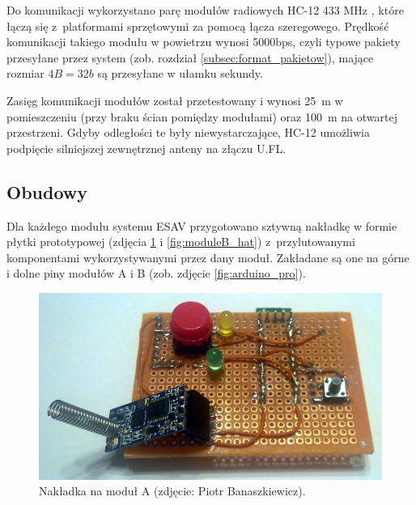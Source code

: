 Do komunikacji wykorzystano parę modułów radiowych HC-12 433 MHz \cite{HC12}, które łączą się z~platformami sprzętowymi za pomocą łącza szeregowego. Prędkość komunikacji takiego modułu w powietrzu wynosi 5000bps, czyli typowe pakiety przesyłane przez system (zob. rozdział \ref{subsec:format_pakietow}), mające rozmiar $ 4B=32b $ są przesyłane w ułamku sekundy.

Zasięg komunikacji modułów został przetestowany i wynosi \SI{25}{\meter} w pomieszczeniu (przy braku ścian pomiędzy modułami) oraz \SI{100}{\meter} na otwartej przestrzeni. Gdyby odległości te były niewystarczające, HC-12 umożliwia podpięcie silniejszej zewnętrznej anteny \cite{HC12} na złączu U.FL.

\subsection{Obudowy}
\label{subsec:obudowy}

Dla każdego modułu systemu ESAV przygotowano sztywną nakładkę w formie płytki prototypowej (zdjęcia \ref{fig:moduleA_hat} i \ref{fig:moduleB_hat}) z~przylutowanymi komponentami wykorzystywanymi przez dany moduł. Zakładane są one na górne i dolne piny modułów A i B (zob. zdjęcie \ref{fig:arduino_pro}).

\begin{figure}[h]
	\centering
	\includegraphics[scale=0.3]{pics/moduleA_hat.jpg}
	\caption{\label{fig:moduleA_hat}Nakładka na moduł A (zdjęcie: Piotr Banaszkiewicz).}
\end{figure}

